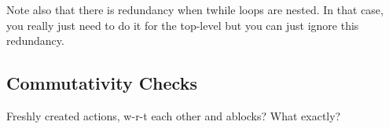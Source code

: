 Note also that there is redundancy when twhile loops are nested.  In that case, you really just need to do it for the top-level but you can just ignore this redundancy.

\subsection{Commutativity Checks}
Freshly created actions, w-r-t each other and ablocks? What exactly?




